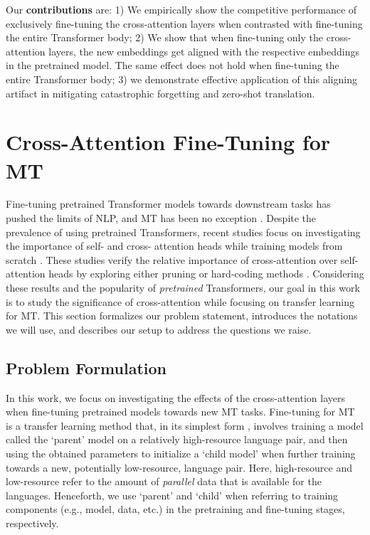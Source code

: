Our \textbf{contributions} are: 1) We empirically show the competitive performance of exclusively fine-tuning the cross-attention layers when contrasted with fine-tuning the entire Transformer body; 2) We show that when fine-tuning only the cross-attention layers, the new embeddings get aligned with the respective embeddings in the pretrained model. The same effect does not hold when fine-tuning the entire Transformer body; 3) we demonstrate effective application of this aligning artifact in mitigating catastrophic forgetting \cite{Goodfellow14anempirical} and zero-shot translation.

\section{Cross-Attention Fine-Tuning for MT}
\label{sec:expdesign}

Fine-tuning pretrained Transformer models towards downstream tasks has pushed the limits of NLP, and MT has been no exception \cite{liu-etal-2020-multilingual}. Despite the prevalence of using pretrained Transformers, recent studies focus on investigating the importance of self- and cross- attention heads while training models from scratch \cite{voita-etal-2019-analyzing, NEURIPS2019_2c601ad9, you-etal-2020-hard}. These studies verify the relative importance of cross-attention over self-attention heads by exploring either pruning \cite{voita-etal-2019-analyzing, NEURIPS2019_2c601ad9} or hard-coding methods \cite{you-etal-2020-hard}. Considering these results and the popularity of \textit{pretrained} Transformers, our goal in this work is to study the significance of cross-attention while focusing on transfer learning for MT. This section formalizes our problem statement, introduces the notations we will use, and describes our setup to address the questions we raise.

\subsection{Problem Formulation}
\label{subsec:prob}

In this work, we focus on investigating the effects of the cross-attention layers when fine-tuning pretrained models towards new MT tasks. Fine-tuning for MT is a transfer learning method that, in its simplest form \cite{zoph-etal-2016-transfer}, involves training a model called the `parent' model on a relatively high-resource language pair, and then using the obtained parameters to initialize a `child model' when further training towards a new, potentially low-resource, language pair. Here, high-resource and low-resource refer to the amount of \textit{parallel} data that is available for the languages. Henceforth, we use `parent' and `child' when referring to training components (e.g., model, data, etc.) in the pretraining and fine-tuning stages, respectively.

